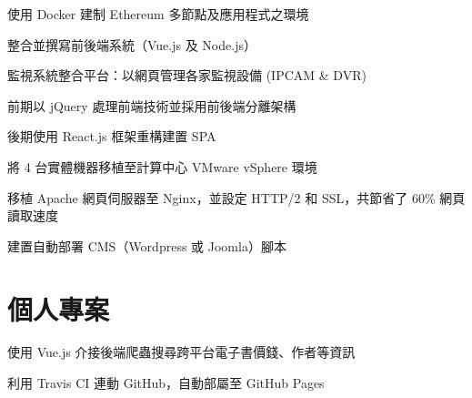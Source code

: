 \documentclass[]{deedy-resume-openfont-ch}
\begin{document}
\begin{minipage}[t]{0.45\textwidth}
\begin{tightemize}
    \item 使用 Docker 建制 Ethereum 多節點及應用程式之環境
    \item 整合並撰寫前後端系統（Vue.js 及 Node.js）
\end{tightemize}

\begin{tightemize}
    \item 監視系統整合平台：以網頁管理各家監視設備 (IPCAM \& DVR)
    \item 前期以 jQuery 處理前端技術並採用前後端分離架構
    \item 後期使用 React.js 框架重構建置 SPA
\end{tightemize}

\begin{tightemize}
    \item 將 4 台實體機器移植至計算中心 VMware vSphere 環境
    \item 移植 Apache 網頁伺服器至 Nginx，並設定 HTTP/2 和 SSL，共節省了 60\% 網頁讀取速度
    \item 建置自動部署 CMS（Wordpress 或 Joomla）腳本
\end{tightemize}
\sectionsep

\section{個人專案}

\begin{tightemize}
    \item 使用 Vue.js 介接後端爬蟲搜尋跨平台電子書價錢、作者等資訊
    \item 利用 Travis CI 連動 GitHub，自動部屬至 GitHub Pages 
\end{tightemize}

\sectionsep


%
%

\end{minipage}
\end{document}
